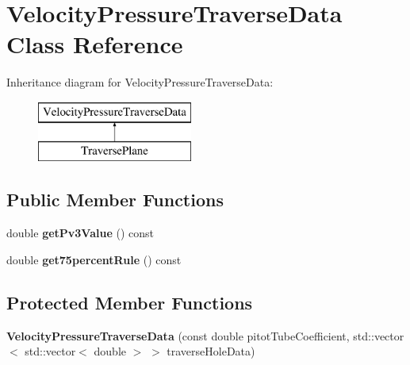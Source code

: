 \hypertarget{class_velocity_pressure_traverse_data}{}\section{Velocity\+Pressure\+Traverse\+Data Class Reference}
\label{class_velocity_pressure_traverse_data}
Inheritance diagram for Velocity\+Pressure\+Traverse\+Data\+:\begin{figure}[H]
\begin{center}
\leavevmode
\includegraphics[height=2.000000cm]{d8/d09/class_velocity_pressure_traverse_data}
\end{center}
\end{figure}
\subsection*{Public Member Functions}
\begin{DoxyCompactItemize}
\item 
\mbox{\label{class_velocity_pressure_traverse_data_ad40651783106845a732537b60877c70f}} 
double {\bfseries get\+Pv3\+Value} () const
\item 
\mbox{\label{class_velocity_pressure_traverse_data_aabde4db04d805c4264d3fc2036ef38a8}} 
double {\bfseries get75percent\+Rule} () const
\end{DoxyCompactItemize}
\subsection*{Protected Member Functions}
\begin{DoxyCompactItemize}
\item 
\mbox{\label{class_velocity_pressure_traverse_data_a7b099c4eb6b034b880aa167d98848c53}} 
{\bfseries Velocity\+Pressure\+Traverse\+Data} (const double pitot\+Tube\+Coefficient, std\+::vector$<$ std\+::vector$<$ double $>$ $>$ traverse\+Hole\+Data)
\end{DoxyCompactItemize}
